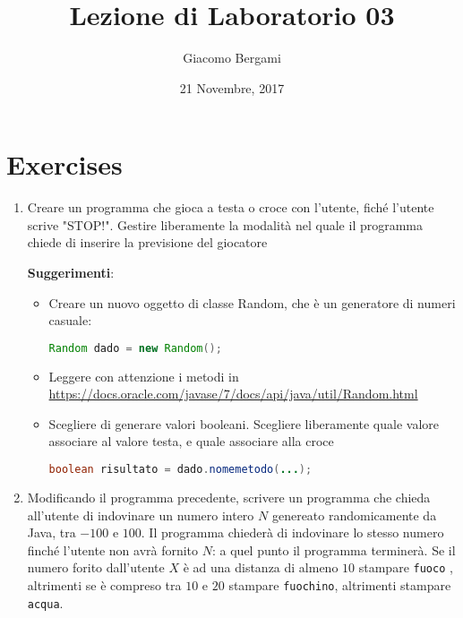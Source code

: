 \documentclass[]{scrartcl}
\title{Lezione di Laboratorio 03}
\date{21 Novembre, 2017}
\author{Giacomo Bergami}
\begin{document}
\maketitle
\section*{Exercises}

\begin{enumerate}
\item        Creare un programma che gioca a testa o croce con l'utente, fiché l'utente scrive "STOP!".
Gestire liberamente la modalità nel quale il programma chiede di inserire la previsione del giocatore

\textbf{Suggerimenti}:
\begin{itemize}
\item Creare un nuovo oggetto di classe Random, che è un generatore di numeri casuale:
\begin{lstlisting}[language=Java]
Random dado = new Random();
\end{lstlisting}
\item Leggere con attenzione i metodi in \url{https://docs.oracle.com/javase/7/docs/api/java/util/Random.html}
\item Scegliere di generare valori booleani. Scegliere liberamente quale valore associare al valore testa, e quale
associare alla croce
\begin{lstlisting}[language=Java]
boolean risultato = dado.nomemetodo(...);
\end{lstlisting}
\end{itemize}

\item        Modificando il programma precedente, scrivere un programma che chieda all'utente di indovinare un numero intero $N$
genereato randomicamente da Java, tra $-100$ e $100$. Il programma chiederà di indovinare lo stesso numero finché l'utente non
avrà fornito $N$: a quel punto il programma terminerà. Se il numero forito dall'utente $X$ è ad una distanza di almeno
$10$ stampare \texttt{fuoco} , altrimenti se è compreso tra $10$ e $20$ stampare \texttt{fuochino}, altrimenti stampare \texttt{acqua}.


\end{enumerate}
\end{document}
